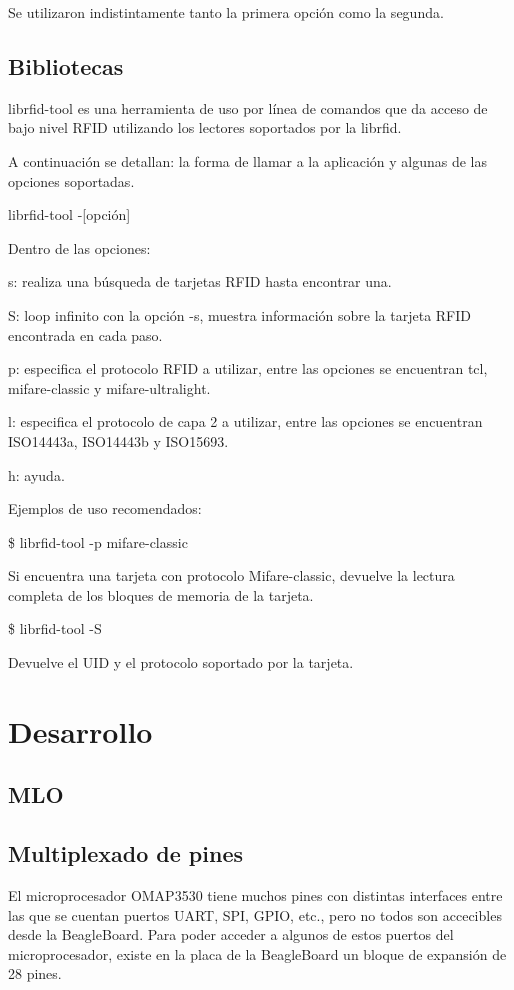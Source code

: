 \bigskip
Se utilizaron indistintamente tanto la primera opción como la segunda.

\subsection{Bibliotecas}
librfid-tool es una herramienta de uso por línea de comandos que da acceso de bajo nivel RFID utilizando los lectores soportados por la librfid.

\bigskip
A continuación se detallan: la forma de llamar a la aplicación y algunas de las opciones soportadas.

\bigskip
librfid-tool -[opción]

\bigskip
Dentro de las opciones:

s: realiza una búsqueda de tarjetas RFID hasta encontrar una.

S: loop infinito con la opción -s, muestra información sobre la tarjeta RFID encontrada en cada paso.

p: especifica el protocolo RFID a utilizar, entre las opciones se encuentran tcl, mifare-classic y  mifare-ultralight.

l: especifica el protocolo de capa 2 a utilizar, entre las opciones se encuentran ISO14443a, ISO14443b y ISO15693.

h: ayuda.

\bigskip
Ejemplos de uso recomendados:

\bigskip
\$ librfid-tool -p mifare-classic

Si encuentra una tarjeta con protocolo Mifare-classic, devuelve la lectura completa de los bloques de memoria de la tarjeta.

\bigskip
\$ librfid-tool -S

Devuelve el UID y el protocolo soportado por la tarjeta.

\section{Desarrollo}

\subsection{MLO}

\subsection{Multiplexado de pines}
El microprocesador OMAP3530 tiene muchos pines con distintas interfaces entre las
que se cuentan puertos UART, SPI, GPIO, etc., pero no todos son accecibles desde la BeagleBoard. 
Para poder acceder a algunos de estos puertos del microprocesador, existe en la placa de la
BeagleBoard un bloque de expansión de 28 pines.

